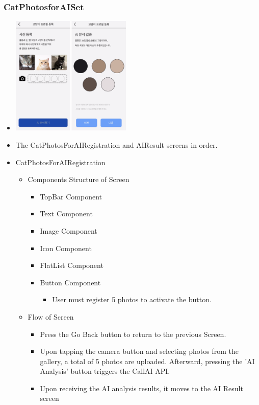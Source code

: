 \documentclass[conference]{IEEEtran}
\begin{document}
\subsubsection{CatPhotosforAISet}
\begin{itemize}
    \item[] \includegraphics[width=0.45\textwidth]{img/Screen/11.png}
    \item The CatPhotosForAIRegistration and AIResult screens in order.
    \item CatPhotosForAIRegistration
    \begin{itemize}
        \item Components Structure of Screen
        \begin{itemize}
            \item TopBar Component
            \item Text Component
            \item Image Component
            \item Icon Component
            \item FlatList Component
            \item Button Component
            \begin{itemize}
                \item User must register 5 photos to activate the button.
            \end{itemize}
        \end{itemize}
        \item Flow of Screen
        \begin{itemize}
            \item Press the Go Back button to return to the previous Screen.
            \item Upon tapping the camera button and selecting photos from the gallery, a total of 5 photos are uploaded. Afterward, pressing the 'AI Analysis' button triggers the CallAI API.
            \item Upon receiving the AI analysis results, it moves to the AI Result screen\\

\end{itemize}
\end{itemize}
\end{itemize}
\end{document}

